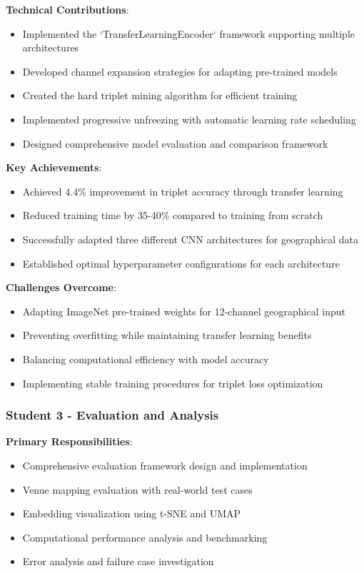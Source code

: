 \textbf{Technical Contributions}:
\begin{itemize}
    \item Implemented the `TransferLearningEncoder` framework supporting multiple architectures
    \item Developed channel expansion strategies for adapting pre-trained models
    \item Created the hard triplet mining algorithm for efficient training
    \item Implemented progressive unfreezing with automatic learning rate scheduling
    \item Designed comprehensive model evaluation and comparison framework
\end{itemize}

\textbf{Key Achievements}:
\begin{itemize}
    \item Achieved 4.4\% improvement in triplet accuracy through transfer learning
    \item Reduced training time by 35-40\% compared to training from scratch
    \item Successfully adapted three different CNN architectures for geographical data
    \item Established optimal hyperparameter configurations for each architecture
\end{itemize}

\textbf{Challenges Overcome}:
\begin{itemize}
    \item Adapting ImageNet pre-trained weights for 12-channel geographical input
    \item Preventing overfitting while maintaining transfer learning benefits
    \item Balancing computational efficiency with model accuracy
    \item Implementing stable training procedures for triplet loss optimization
\end{itemize}

\subsubsection{Student 3 - Evaluation and Analysis}

\textbf{Primary Responsibilities}:
\begin{itemize}
    \item Comprehensive evaluation framework design and implementation
    \item Venue mapping evaluation with real-world test cases
    \item Embedding visualization using t-SNE and UMAP
    \item Computational performance analysis and benchmarking
    \item Error analysis and failure case investigation
\end{itemize}

